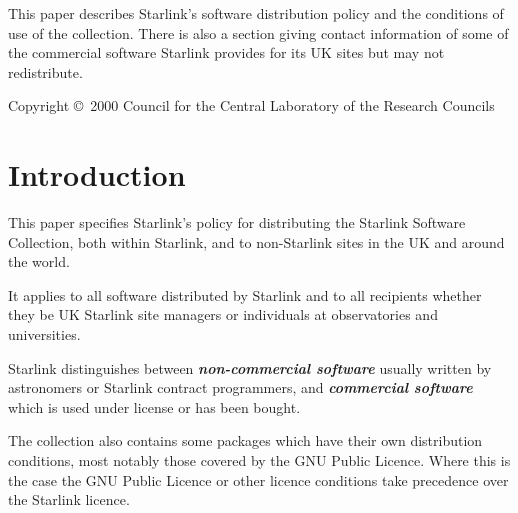 \documentclass[twoside,11pt]{article}
\newcommand{\stardocinitials}  {SGP}
\newcommand{\stardoccopyright}
{Copyright \copyright\ 2000 Council for the Central Laboratory of the Research Councils}
\newcommand{\stardocnumber}    {21.10}
\newcommand{\stardocabstract}  {This paper describes Starlink's software
distribution policy and the conditions of use of the collection.
There is also a section giving contact information of some of the
commercial software Starlink provides for its UK sites but may not
redistribute.}
\newcommand{\stardocname}{\stardocinitials /\stardocnumber}
\newenvironment{latexonly}{}{}
\newcommand{\xlabel}[1]{}
\renewcommand{\_}{\texttt{\symbol{95}}}
\renewcommand{\thepage}{\roman{page}}
\begin{document}
\stardocabstract


  \newpage
  \begin{latexonly}
    \setlength{\parskip}{0mm}
    \tableofcontents
    \vspace*{\fill}
    \stardoccopyright
    \setlength{\parskip}{\medskipamount}
    \markboth{\stardocname}{\stardocname}
  \end{latexonly}
\cleardoublepage
\renewcommand{\thepage}{\arabic{page}}
\setcounter{page}{1}

\section{\xlabel{introduction}Introduction}
\label{introduction}

This paper specifies Starlink's policy for distributing the Starlink Software
Collection, both within Starlink, and to non-Starlink sites in the UK and
around the world.

It applies to all software distributed by Starlink and to all recipients
whether they be UK Starlink site managers or individuals at observatories
and universities.

Starlink distinguishes between \textbf{\textit{non-commercial
software}} usually written by astronomers or Starlink contract
programmers, and \textbf{\textit{commercial software}} which is used
under license or has been bought.

The collection also contains some packages which have their own
distribution conditions, most notably those covered by the GNU Public
Licence.  Where this is the case the GNU Public Licence or other
licence conditions take precedence over the Starlink licence.
\end{document}
